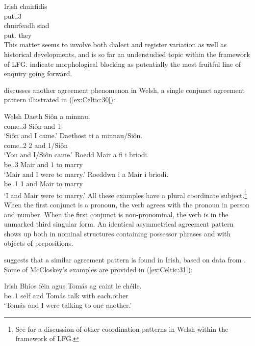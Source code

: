 \documentclass[output=paper,colorlinks,citecolor=brown]{langscibook}
\begin{document}
\ea\label{ex:Celtic:29} Irish \citep[491]{McCloskeyHale1984}
\ea\gll chuirfidís\\
put.\COND.3\PL\\
\ex\gll chuirfeadh  siad\\
put.{\COND} they\\
\z\z
This matter seems to involve both dialect and register variation as well as historical developments, and is so far an understudied topic within the framework of LFG. \citet[531]{McCloskeyHale1984} indicate morphological blocking as potentially the most fruitful line of enquiry going forward.

\citet{Sadler1999} discusses another agreement phenomenon in Welsh, a single conjunct agreement pattern illustrated in (\ref{ex:Celtic:30}):

\ea\label{ex:Celtic:30} Welsh \citep[2]{Sadler1999}
\ea
\gll Daeth Si\^{o}n a minnau.\\
{come.\PST.3\SG} Si\^{o}n and 1\SG\\
\glt`Si\^{o}n and I came.'
\ex
\gll Daethost ti a minnau/Si\^{o}n.\\
{come.\PST.2\SG} {2\SG} and 1\SG/Si\^{o}n\\
\glt`You and I/Si\^{o}n came.'
\ex
\gll Roedd Mair a fi i briodi.\\
{be.\PST.3\SG} Mair and {1\SG} to marry\\
\glt`Mair and I were to marry.'
\ex
\gll Roeddwn i  a Mair i briodi.\\
{be.\PST.1\SG} {1\SG} and Mair to marry\\
\glt`I and Mair were to marry.'
\z\z 
All these examples have a plural coordinate subject.\footnote{See \citet{Sadler2006} for a discussion of other coordination patterns in Welsh within the framework of LFG.} When the first conjunct is a pronoun, the verb agrees with the pronoun in person and number. When the first conjunct is non-pronominal, the verb is in the unmarked third singular form. An identical asymmetrical agreement pattern shows up both in nominal structures containing possessor phrases and with objects of prepositions.

\citet[3--4]{Sadler1999} suggests that a similar agreement pattern is found in Irish, based on data from \citet{McCloskey1986}. Some of McCloskey's examples are provided in (\ref{ex:Celtic:31}): 

\ea\label{ex:Celtic:31} Irish \citep[248]{McCloskey1986}
\ea
\gll Bhíos  f\'ein agus Tomás ag  caint le ch\'eile.\\
{be.\PST.1\SG} self and Tomás {\PROG} talk with each.other\\
\glt`Tomás and I were talking to one another.'
\end{document}
